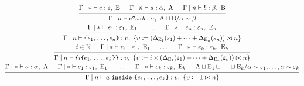 \documentclass{article}
\newcommand{\A}{\mathrm{A}}
\newcommand{\B}{\mathrm{B}}
\newcommand{\E}{\mathrm{E}}
\renewcommand{\epsilon}{\varepsilon}
\begin{document}
\begin{spreadlines}{2em}
  \begin{gather*}
    \begin{prooftree}
      \hypo{\Gamma \mid \ast \vdash e: \epsilon,~\E} \hypo{\Gamma \mid
        n \vdash a: \alpha,~\A} \hypo{\Gamma \mid n \vdash b:
        \beta,~\B} \infer3{\Gamma \mid n \vdash e \texttt{?} a
        \texttt{:} b: \alpha,~\A \sqcup \B / \alpha \sim \beta}
    \end{prooftree}
    \\
    \begin{prooftree}
      \hypo{\Gamma \mid \ast \vdash e_1: \epsilon_1,~\E_1}
      \hypo{\dots} \hypo{\Gamma \mid \ast \vdash e_n:
        \epsilon_n,~\E_n} \infer3{\Gamma \mid n \vdash \texttt{\{}e_1,
        \texttt{\dots}, e_n \texttt{\}} : \upsilon,~\left\{\upsilon
        \coloneq \left(\Delta_{\E_1}(\epsilon_1) + \cdots +
        \Delta_{\E_n}(\epsilon_n)\right)\bowtie n\right\}}
    \end{prooftree}
    \\
    \begin{prooftree}
      \hypo{i \in \mathbb{N}} \hypo{\Gamma \mid \ast \vdash e_1:
        \epsilon_1,~\E_1} \hypo{\dots} \hypo{\Gamma \mid \ast \vdash
        e_k: \epsilon_k,~\E_k} \infer4{\Gamma \mid n \vdash
        \texttt{\{}i\texttt{\{}e_1, \texttt{\dots}, e_k
        \texttt{\}}\texttt{\}} : \upsilon,~\left\{\upsilon \coloneq
        i\times\left(\Delta_{\E_1}(\epsilon_1) + \cdots +
        \Delta_{\E_k}(\epsilon_k)\right) \bowtie n\right\}}
    \end{prooftree}
    \\
    \begin{prooftree}
      \hypo{\Gamma \mid \ast \vdash a: \alpha,~\A} \hypo{\Gamma \mid
        \ast \vdash e_1: \epsilon_1,~\E_1} \hypo{\dots} \hypo{\Gamma
        \mid \ast \vdash e_k: \epsilon_k,~\E_k} \hypo{\A \sqcup \E_1
        \sqcup \cdots \sqcup \E_k / \alpha \sim \epsilon_1, \dots,
        \alpha \sim \epsilon_k} \infer5{\Gamma \mid n \vdash
        a~\texttt{inside}~\texttt{\{}e_1, \texttt{\dots}, e_k
        \texttt{\}} : \upsilon,~\left\{\upsilon \coloneq 1 \bowtie
        n\right\}}
    \end{prooftree}
  \end{gather*}
\end{spreadlines}
\end{document}
